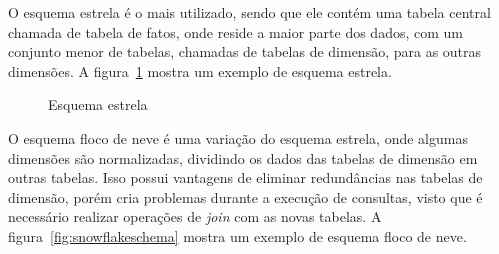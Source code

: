 O esquema estrela é o mais utilizado, sendo que ele contém uma tabela central chamada de tabela de fatos, onde reside a maior parte dos dados, com um conjunto menor de tabelas, chamadas de tabelas de dimensão, para as outras dimensões.
A figura~\ref{fig:starschema} mostra um exemplo de esquema estrela.

\begin{figure}[!htb]
	\caption{Esquema estrela}\label{fig:starschema}
	\vspace{6mm}
	\begin{center}
	\end{center}
	\vspace{1mm}
	\legenda{}
\end{figure}

O esquema floco de neve é uma variação do esquema estrela, onde algumas dimensões são normalizadas, dividindo os dados das tabelas de dimensão em outras tabelas.
Isso possui vantagens de eliminar redundâncias nas tabelas de dimensão, porém cria problemas durante a execução de consultas, visto que é necessário realizar operações de \textit{join} com as novas tabelas.
A figura~\ref{fig:snowflakeschema} mostra um exemplo de esquema floco de neve.

